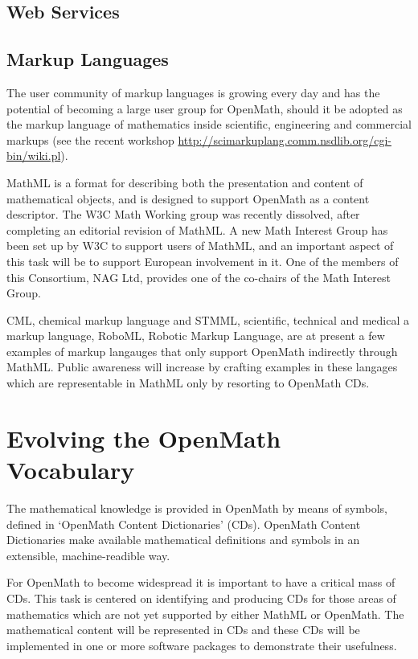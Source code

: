 \documentclass[draft]{artikel3}
\begin{document}
\subsection{Web Services}
\label{sec:ws}



\subsection{Markup Languages}
\label{sec:ml}

The user community of markup languages is growing every day and has
the potential of becoming a large user group for OpenMath, should it
be adopted as the markup language of mathematics inside scientific,
engineering and commercial markups (see the recent workshop
\url{http://scimarkuplang.comm.nsdlib.org/cgi-bin/wiki.pl}).

MathML is a format for describing both the presentation and content of
mathematical objects, and is designed to support OpenMath as a content
descriptor.  The W3C Math Working group was recently dissolved, after
completing an editorial revision of MathML.  A new Math Interest Group
has been set up by W3C to support users of MathML, and an important
aspect of this task will be to support European involvement in it.
One of the members of this Consortium, NAG Ltd, provides one of the
co-chairs of the Math Interest Group.

CML, chemical markup language and STMML, scientific, technical and
medical a markup language, RoboML, Robotic Markup Language, are at
present a few examples of markup langauges that only support OpenMath
indirectly through MathML.  Public awareness will increase by crafting
examples in these langages which are representable in MathML only by
resorting to OpenMath CDs.

\section{Evolving the OpenMath Vocabulary}
\label{sec:OCD}

The mathematical knowledge is provided in OpenMath by means of
symbols, defined in `OpenMath Content Dictionaries' (CDs).  OpenMath
Content Dictionaries make available mathematical definitions and
symbols in an extensible, machine-readible way.

For OpenMath to become widespread it is important to have a critical
mass of CDs. This task is centered on identifying and producing CDs
for those areas of mathematics which are not yet supported by either
MathML or OpenMath. The mathematical content will be represented in
CDs and these CDs will be implemented in one or more software packages
to demonstrate their usefulness.
\end{document}
